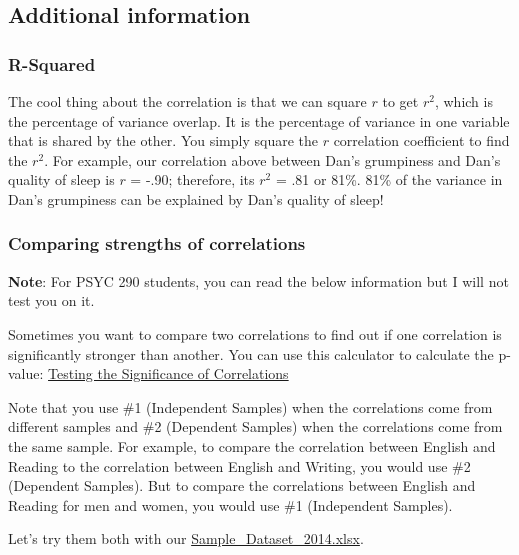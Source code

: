 \documentclass[
]{book}
\begin{document}
\hypertarget{additional-information-4}{%
\subsection{Additional information}\label{additional-information-4}}

\hypertarget{r-squared}{%
\subsubsection{R-Squared}\label{r-squared}}

The cool thing about the correlation is that we can square \(r\) to get \(r^2\), which is the percentage of variance overlap. It is the percentage of variance in one variable that is shared by the other. You simply square the \(r\) correlation coefficient to find the \(r^2\). For example, our correlation above between Dan's grumpiness and Dan's quality of sleep is \(r\) = -.90; therefore, its \(r^2\) = .81 or 81\%. 81\% of the variance in Dan's grumpiness can be explained by Dan's quality of sleep!

\hypertarget{comparing-strengths-of-correlations}{%
\subsubsection{Comparing strengths of correlations}\label{comparing-strengths-of-correlations}}

\textbf{Note}: For PSYC 290 students, you can read the below information but I will not test you on it.

Sometimes you want to compare two correlations to find out if one correlation is significantly stronger than another. You can use this calculator to calculate the p-value: \href{https://www.psychometrica.de/correlation.html}{Testing the Significance of Correlations}

Note that you use \#1 (Independent Samples) when the correlations come from different samples and \#2 (Dependent Samples) when the correlations come from the same sample. For example, to compare the correlation between English and Reading to the correlation between English and Writing, you would use \#2 (Dependent Samples). But to compare the correlations between English and Reading for men and women, you would use \#1 (Independent Samples).

Let's try them both with our \href{https://github.com/danawanzer/stats-with-jamovi/blob/master/data/Sample_Dataset_2014.xlsx}{Sample\_Dataset\_2014.xlsx}.
\end{document}
